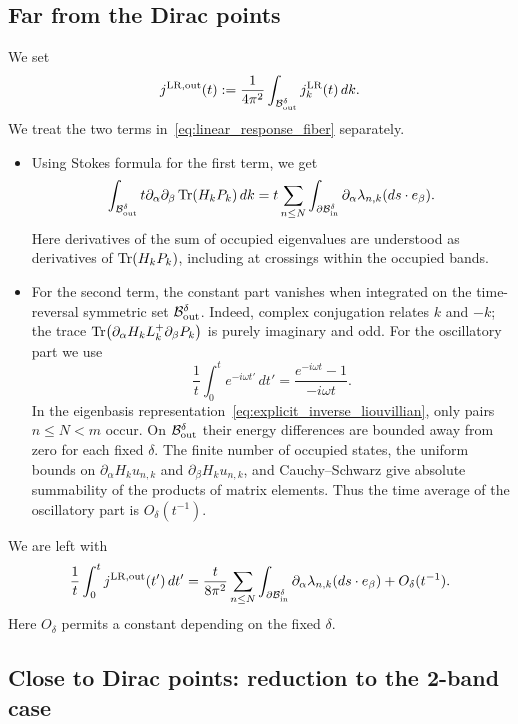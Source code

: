 \documentclass[a4paper,11pt]{article}
\theoremstyle{plain}
\theoremstyle{remark}
\begin{document}
\subsection{Far from the Dirac points}
We set
\[
j^{{\rm LR},{\rm out}}(t):=
\frac1{4\pi^2}\int_{\mathcal B_{\rm out}^\delta}j_k^{\rm LR}(t)\,dk.
\]
We treat the two terms in~\eqref{eq:linear_response_fiber} separately.
\begin{itemize}
\item Using Stokes formula for the first term, we get
\begin{equation}\label{secondslot}
\int_{\mathcal B_{\rm out}^\delta}
t\partial_\alpha\partial_\beta\Tr(H_kP_k)\,dk
=t\sum_{n\le N}\int_{\partial\mathcal B_{\rm in}^\delta}
\partial_\alpha\lambda_{n,k}(ds\cdot e_\beta).
\end{equation}
Here derivatives of the sum of occupied eigenvalues are understood as
derivatives of $\Tr(H_kP_k)$, including at crossings within the occupied bands.
\item For the second term, the constant part vanishes when integrated
on the time-reversal symmetric set $\mathcal B_{\rm out}^\delta$.
Indeed, complex conjugation relates $k$ and $-k$; the trace
$\Tr(\partial_\alpha H_kL_k^+\partial_\beta P_k)$
is purely imaginary and odd. For the oscillatory part we use
\[
\frac1t\int_0^t e^{-i\omega t'}\,dt'
=\frac{e^{-i\omega t}-1}{-i\omega t}.
\]
In the eigenbasis representation~\eqref{eq:explicit_inverse_liouvillian},
only pairs $n\le N<m$ occur. On
$\mathcal B_{\rm out}^\delta$ their energy differences are bounded
away from zero for each fixed $\delta$. The finite number of occupied
states, the uniform bounds on $\partial_\alpha H_ku_{n,k}$ and
$\partial_\beta H_ku_{n,k}$, and Cauchy--Schwarz give absolute
summability of the products of matrix elements. Thus the time average
of the oscillatory part is $O_\delta(t^{-1})$.
\end{itemize}
We are left with
\begin{equation}\label{Bout}
\frac1t\int_0^t j^{{\rm LR},{\rm out}}(t')\,dt'
=\frac{t}{8\pi^2}\sum_{n\le N}
\int_{\partial\mathcal B_{\rm in}^\delta}
\partial_\alpha\lambda_{n,k}(ds\cdot e_\beta)
+O_\delta(t^{-1}).
\end{equation}
Here $O_\delta$ permits a constant depending on the fixed $\delta$.

\subsection{Close to Dirac points: reduction to the 2-band case}
\label{sec:dirac_reduc}
\end{document}

